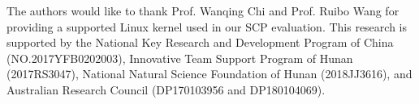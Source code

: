 \documentclass[format=acmsmall, review=false, screen=true, anonymous=false]{acmart}
\begin{document}





\begin{acks}

The authors would like to thank Prof. Wanqing Chi and Prof. Ruibo Wang
for providing a supported Linux kernel used in our SCP evaluation.
This research is supported by
the National Key Research and Development Program 
of China (NO.2017YFB0202003),
Innovative Team Support Program of Hunan (2017RS3047),
National Natural Science Foundation of Hunan (2018JJ3616),
and Australian Research Council (DP170103956 and DP180104069).


\end{acks}



\end{document}
